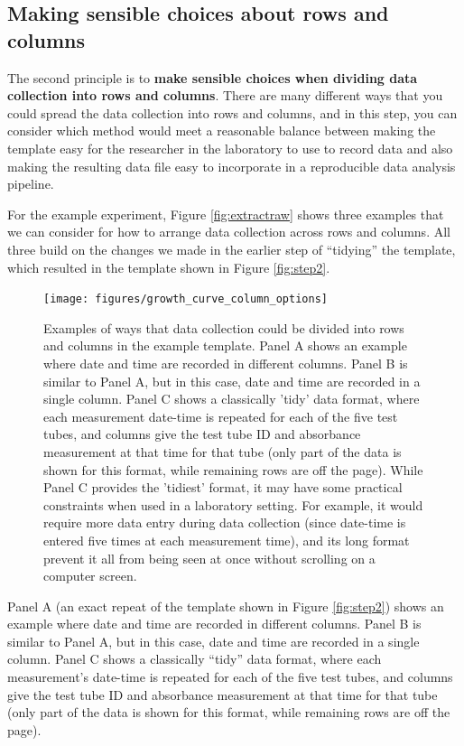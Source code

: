 \documentclass[]{tufte-book}
\begin{document}
\subsection{Making sensible choices about rows and columns}\label{making-sensible-choices-about-rows-and-columns}

The second principle is to \textbf{make sensible choices when dividing data collection
into rows and columns}. There are many different ways that you could spread the
data collection into rows and columns, and in this step, you can consider which
method would meet a reasonable balance between making the template easy for the
researcher in the laboratory to use to record data and also making the resulting
data file easy to incorporate in a reproducible data analysis pipeline.

For the example experiment, Figure \ref{fig:extractraw} shows three examples
that we can consider for how to arrange data collection across rows and columns.
All three build on the changes we made in the earlier step of ``tidying'' the template,
which resulted in the template shown in Figure \ref{fig:step2}.

\begin{figure}
\texttt{[image: figures/growth\_curve\_column\_options]} \caption[Examples of ways that data collection could be divided into rows and columns in the example template]{Examples of ways that data collection could be divided into rows and columns in the example template. Panel A shows an example where date and time are recorded in different columns. Panel B is similar to Panel A, but in this case, date and time are recorded in a single column. Panel C shows a classically 'tidy' data format, where each measurement date-time is repeated for each of the five test tubes, and columns give the test tube ID and absorbance measurement at that time for that tube (only part of the data is shown for this format, while remaining rows are off the page). While Panel C provides the 'tidiest' format, it may have some practical constraints when used in a laboratory setting. For example, it would require more data entry during data collection (since date-time is entered five times at each measurement time), and its long format prevent it all from being seen at once without scrolling on a computer screen.}\label{fig:columnoptions}
\end{figure}

Panel A (an exact repeat of the template shown in Figure \ref{fig:step2}) shows
an example where date and time are recorded in different columns. Panel B is
similar to Panel A, but in this case, date and time are recorded in a single
column. Panel C shows a classically ``tidy'' data format, where each measurement's
date-time is repeated for each of the five test tubes, and columns give the test
tube ID and absorbance measurement at that time for that tube (only part of the
data is shown for this format, while remaining rows are off the page).
\end{document}

